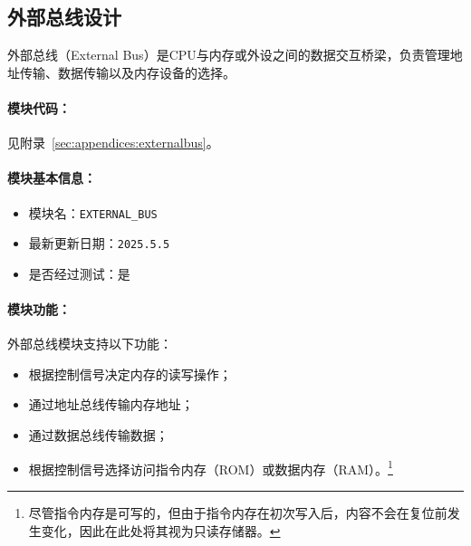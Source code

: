 \documentclass[lang=cn,a4paper,newtx]{elegantpaper}
\begin{document}
\subsection{外部总线设计}
外部总线（External Bus）是CPU与内存或外设之间的数据交互桥梁，负责管理地址传输、数据传输以及内存设备的选择。
\paragraph{模块代码：}
见附录~\ref{sec:appendices:externalbus}。

\paragraph{模块基本信息：}
\begin{itemize}
  \item 模块名：\texttt{EXTERNAL\_BUS}
  \item 最新更新日期：\texttt{2025.5.5}
  \item 是否经过测试：是
\end{itemize}

\paragraph{模块功能：}
外部总线模块支持以下功能：
\begin{itemize}
  \item 根据控制信号决定内存的读写操作；
  \item 通过地址总线传输内存地址；
  \item 通过数据总线传输数据；
  \item 根据控制信号选择访问指令内存（ROM）或数据内存（RAM）。\footnote{尽管指令内存是可写的，但由于指令内存在初次写入后，内容不会在复位前发生变化，因此在此处将其视为只读存储器。}
\end{itemize}
\end{document}
